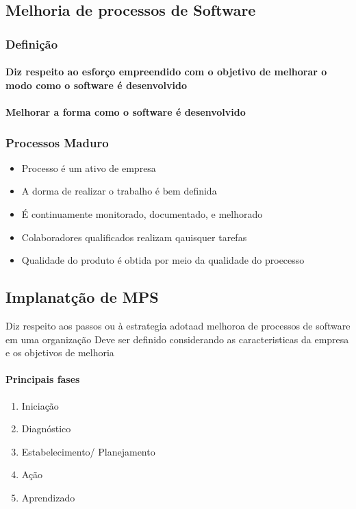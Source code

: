 \documentclass{article}
\begin{document}
\subsection{Melhoria de processos de Software}
\subsubsection{Definição}
\paragraph{Diz respeito ao esforço empreendido com o objetivo de melhorar o modo como o software é desenvolvido}	
\paragraph{Melhorar a forma como o software é desenvolvido}

\subsubsection{Processos Maduro}
	\begin{itemize}
	\item Processo é um ativo de empresa
	\item A dorma de realizar o trabalho é bem definida
	\item É continuamente monitorado, documentado, e melhorado
	\item Colaboradores qualificados realizam qauisquer tarefas
	\item Qualidade do produto é obtida por meio da qualidade do proecesso	
	\end{itemize}

\subsection{Implanatção de MPS}
Diz respeito aos passos ou à estrategia adotaad melhoroa de processos de software em uma organização
Deve ser definido considerando as caracteristicas da empresa e os objetivos de melhoria	

\paragraph{Principais fases}
	\begin{enumerate}
	\item Iniciação
	\item Diagnóstico
	\item Estabelecimento/ Planejamento
	\item Ação
	\item Aprendizado	
	\end{enumerate}
\end{document}
